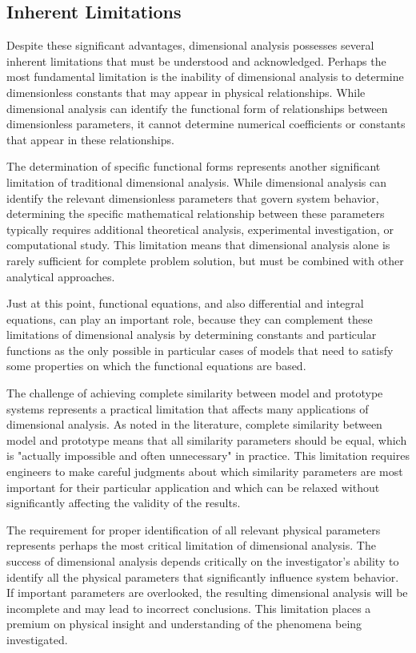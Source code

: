 \documentclass[
	11pt, %
	fleqn, %
	a4paper, %
]{LegrandOrangeBook}
\begin{document}
\subsection{Inherent Limitations}

Despite these significant advantages, dimensional analysis possesses several inherent limitations that must be understood and acknowledged. Perhaps the most fundamental limitation is the inability of dimensional analysis to determine dimensionless constants that may appear in physical relationships. While dimensional analysis can identify the functional form of relationships between dimensionless parameters, it cannot determine numerical coefficients or constants that appear in these relationships.

The determination of specific functional forms represents another significant limitation of traditional dimensional analysis. While dimensional analysis can identify the relevant dimensionless parameters that govern system behavior, determining the specific mathematical relationship between these parameters typically requires additional theoretical analysis, experimental investigation, or computational study. This limitation means that dimensional analysis alone is rarely sufficient for complete problem solution, but must be combined with other analytical approaches.

Just at this point, functional equations, and also differential and integral equations, can play an important role, because they can complement these limitations of dimensional analysis by determining constants and particular functions as the only possible in particular cases of models that need to satisfy some properties on which the functional equations are based.

The challenge of achieving complete similarity between model and prototype systems represents a practical limitation that affects many applications of dimensional analysis. As noted in the literature, complete similarity between model and prototype means that all similarity parameters should be equal, which is "actually impossible and often unnecessary" in practice. This limitation requires engineers to make careful judgments about which similarity parameters are most important for their particular application and which can be relaxed without significantly affecting the validity of the results.

The requirement for proper identification of all relevant physical parameters represents perhaps the most critical limitation of dimensional analysis. The success of dimensional analysis depends critically on the investigator's ability to identify all the physical parameters that significantly influence system behavior. If important parameters are overlooked, the resulting dimensional analysis will be incomplete and may lead to incorrect conclusions. This limitation places a premium on physical insight and understanding of the phenomena being investigated.
\end{document}
